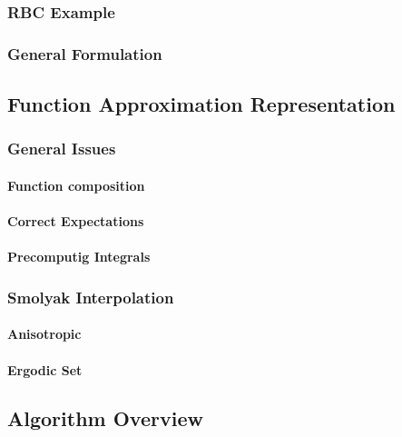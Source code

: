 \documentclass[12pt]{article}
\begin{document}
\subsubsection{RBC Example}
\label{sec:rbcaux}

\subsubsection{General Formulation}
\label{sec:genAux}

\subsection{Function Approximation Representation}
\label{sec:funcApproxRep}

\subsubsection{General Issues}
\label{sec:generalissues}

\paragraph{Function composition}



\paragraph{Correct Expectations}

\paragraph{Precomputig Integrals}


\subsubsection{Smolyak Interpolation}
\label{sec:smolyakinterp}

\paragraph{Anisotropic}

\paragraph{Ergodic Set}

\subsection{Algorithm Overview}
\label{sec:algoverview}
\end{document}
